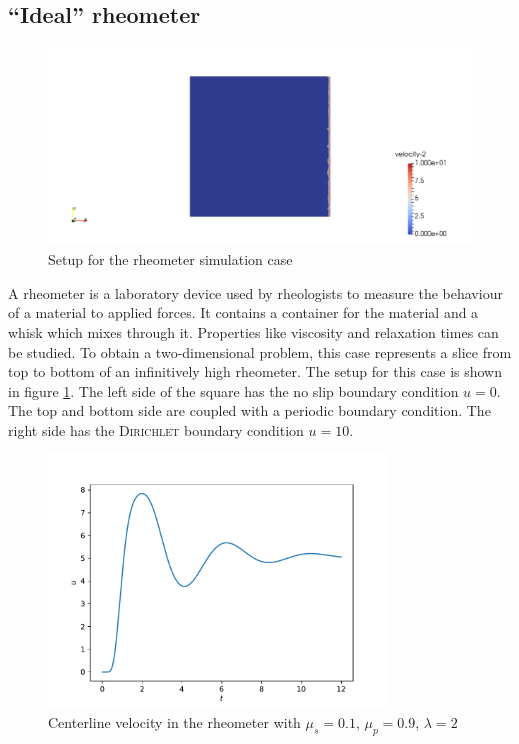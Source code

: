 \documentclass[12pt,a4paper,twoside, open=right]{scrreprt}
\theoremstyle{definition}
\theoremstyle{plain}
\begin{document}
\subsection{\enquote{Ideal} rheometer}
\begin{figure}
    \centering
    \includegraphics[width=\textwidth]{RheometerSetup}
    \caption{Setup for the rheometer simulation case}
    \label{fig:rheometersetup}
\end{figure}
A rheometer is a laboratory device used by rheologists to measure the behaviour of a material to applied forces. It contains a container for the material and a whisk which mixes through it. Properties like viscosity and relaxation times can be studied.
To obtain a two-dimensional problem, this case represents a slice from top to bottom of an infinitively high rheometer.
The setup for this case is shown in figure \ref{fig:rheometersetup}. The left side of the square has the no slip boundary condition $u=0$. The top and bottom side are coupled with a periodic boundary condition. The right side has the \textsc{Dirichlet} boundary condition $u=10$. 
\begin{figure}
    \centering
    \includegraphics[width=0.8\textwidth]{RheometerCenterline}
    \caption{Centerline velocity in the rheometer with $\mu_s=0.1$, $\mu_p=0.9$, $\lambda=2$ }
    \label{fig:rheomcenter}
\end{figure} 
\end{document}

